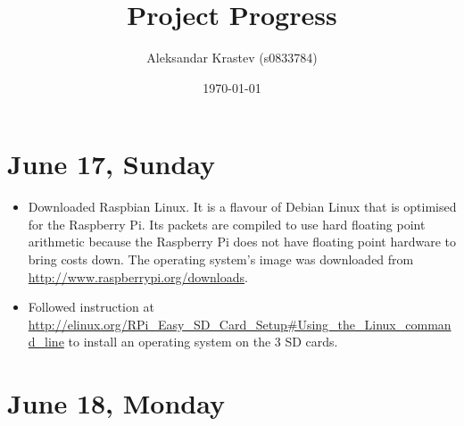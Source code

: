 \documentclass[a4paper,12pt]{article}
\begin{document}
\title{Project Progress}
\date{\today}
\author{Aleksandar Krastev (s0833784)}
\maketitle


\section{June 17, Sunday}

\begin{itemize}
	\item Downloaded Raspbian Linux. It is a flavour of Debian Linux that is optimised for the Raspberry Pi. Its packets are compiled to use hard floating point arithmetic because the Raspberry Pi does not have floating point hardware to bring costs down. The operating system's image was downloaded from \url{http://www.raspberrypi.org/downloads}.
	\item Followed instruction at \url{http://elinux.org/RPi_Easy_SD_Card_Setup#Using_the_Linux_command_line} to install an operating system on the 3 SD cards.
\end{itemize} 

\section{June 18, Monday}
\end{document}
